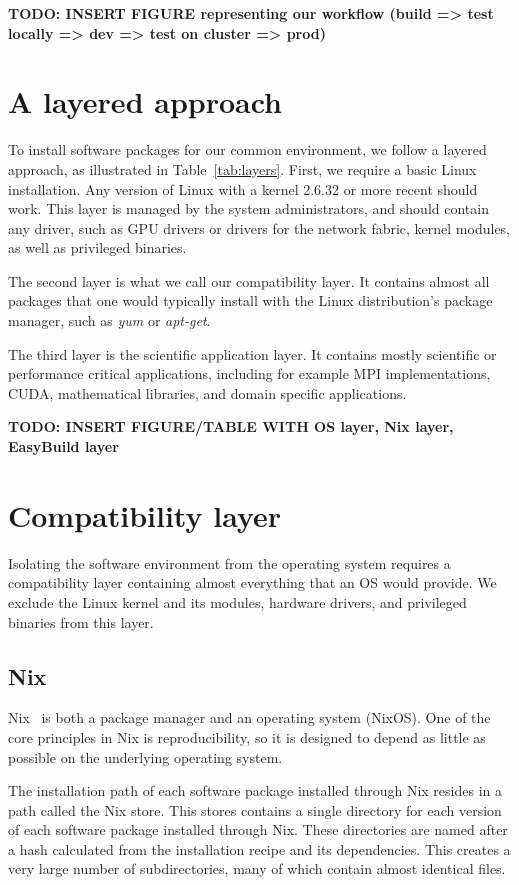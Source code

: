 \documentclass[sigconf]{acmart}
\begin{document}
\textbf{TODO: INSERT FIGURE representing our workflow (build => test locally => dev => test on cluster => prod) }
\label{fig:Workflow}


\section{A layered approach}
\label{sec:Layered_environment}
To install software packages for our common environment, we follow a layered approach, as illustrated in Table~\ref{tab:layers}. First, we require a basic Linux installation. Any version of Linux with a kernel 2.6.32 or more recent should work. This layer is managed by the system administrators, and should contain any driver, such as GPU drivers or drivers for the network fabric, kernel modules, as well as privileged binaries. 

The second layer is what we call our compatibility layer. It contains almost all packages that one would typically install with the Linux distribution's package manager, such as {\it yum} or {\it apt-get}. 

The third layer is the scientific application layer. It contains mostly scientific or performance critical applications, including for example MPI implementations, CUDA, mathematical libraries, and domain specific applications. 

\textbf{TODO: INSERT FIGURE/TABLE WITH OS layer, Nix layer, EasyBuild layer}
\label{tab:layers}


\section{Compatibility layer}
\label{sec:Compatibility_layer}
Isolating the software environment from the operating system requires a compatibility layer containing almost everything that an OS would provide. We exclude the Linux kernel and its modules, hardware drivers, and privileged binaries from this layer.

\subsection{Nix}
\label{sub:Nix}
Nix~\cite{Nix} is both a package manager and an operating system (NixOS). One of the core principles in Nix is reproducibility, so it is designed to depend as little as possible on the underlying operating system. 

The installation path of each software package installed through Nix resides in a path called the Nix store. This stores contains a single directory for each version of each software package installed through Nix. These directories are named after a hash calculated from the installation recipe and its dependencies. This creates a very large number of subdirectories, many of which contain almost identical files. 
\end{document}

